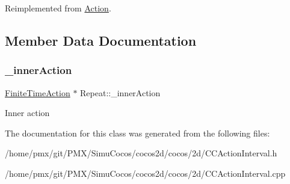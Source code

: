Reimplemented from \hyperlink{classAction_a937e646e63915e33ad05ba149bfcf239}{Action}.



\subsection{Member Data Documentation}
\mbox{\label{classRepeat_ad0a3e5adaaf1f5dfb67336892e4a0219}} 
\subsubsection{\texorpdfstring{\+\_\+inner\+Action}{\_innerAction}}
{\footnotesize\ttfamily \hyperlink{classFiniteTimeAction}{Finite\+Time\+Action} $\ast$ Repeat\+::\+\_\+inner\+Action\hspace{0.3cm}{\ttfamily [protected]}}

Inner action 

The documentation for this class was generated from the following files\+:\begin{DoxyCompactItemize}
\item 
/home/pmx/git/\+P\+M\+X/\+Simu\+Cocos/cocos2d/cocos/2d/C\+C\+Action\+Interval.\+h\item 
/home/pmx/git/\+P\+M\+X/\+Simu\+Cocos/cocos2d/cocos/2d/C\+C\+Action\+Interval.\+cpp\end{DoxyCompactItemize}
